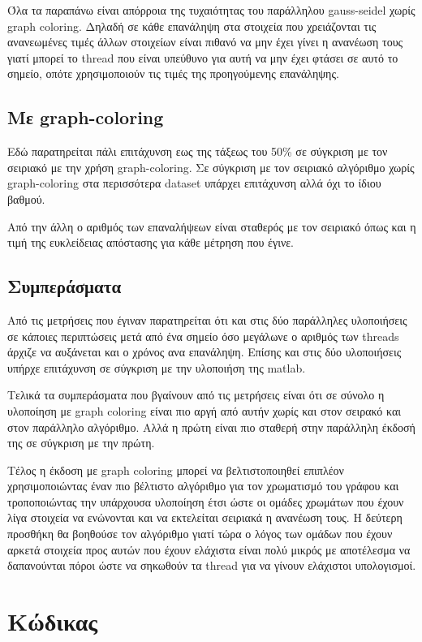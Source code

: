 \documentclass[10p]{report}
\begin{document}
Όλα τα παραπάνω είναι απόρροια της τυχαιότητας του παράλληλου gauss-seidel χωρίς 
graph coloring. Δηλαδή σε κάθε επανάληψη στα στοιχεία που χρειάζονται τις ανανεωμένες 
τιμές άλλων στοιχείων είναι πιθανό να μην έχει γίνει η ανανέωση τους γιατί μπορεί 
το thread που είναι υπεύθυνο για αυτή να μην έχει φτάσει σε αυτό το σημείο, οπότε 
χρησιμοποιούν τις τιμές της προηγούμενης επανάληψης. 

\subsection*{Με graph-coloring}

Εδώ παρατηρείται πάλι επιτάχυνση εως της τάξεως του 50\% σε σύγκριση με τον σειριακό
με την χρήση graph-coloring. Σε σύγκριση με τον σειριακό αλγόριθμο χωρίς graph-coloring 
στα περισσότερα dataset υπάρχει επιτάχυνση αλλά όχι το ίδιου βαθμού. 

Από την άλλη ο αριθμός των επαναλήψεων είναι σταθερός με τον σειριακό όπως και 
η τιμή της ευκλείδειας απόστασης για κάθε μέτρηση που έγινε. 

\subsection*{Συμπεράσματα}
Από τις μετρήσεις που έγιναν παρατηρείται ότι και στις δύο παράλληλες υλοποιήσεις 
σε κάποιες περιπτώσεις μετά από ένα σημείο όσο μεγάλωνε ο αριθμός των threads 
άρχιζε να αυξάνεται και ο χρόνος ανα επανάληψη. Επίσης και στις δύο υλοποιήσεις 
υπήρχε επιτάχυνση σε σύγκριση με την υλοποιήση της matlab. 

Τελικά τα συμπεράσματα που βγαίνουν από τις μετρήσεις είναι ότι σε σύνολο η 
υλοποίηση με graph coloring είναι πιο αργή από αυτήν χωρίς και στον σειρακό και 
στον παράλληλο αλγόριθμο. Αλλά η πρώτη είναι πιο σταθερή στην παράλληλη έκδοσή της 
σε σύγκριση με την πρώτη. 

Τέλος η έκδοση με graph coloring μπορεί να βελτιστοποιηθεί επιπλέον χρησιμοποιώντας 
έναν πιο βέλτιστο αλγόριθμο για τον χρωματισμό του γράφου και τροποποιώντας την 
υπάρχουσα υλοποίηση έτσι ώστε οι ομάδες χρωμάτων που έχουν λίγα στοιχεία να ενώνονται 
και να εκτελείται σειριακά η ανανέωση τους. Η δεύτερη προσθήκη θα βοηθούσε τον 
αλγόριθμο γιατί τώρα ο λόγος των ομάδων που έχουν αρκετά στοιχεία προς αυτών που έχουν ελάχιστα
είναι πολύ μικρός με αποτέλεσμα να δαπανούνται πόροι ώστε να σηκωθούν τα thread για να
γίνουν ελάχιστοι υπολογισμοί. 

\section*{Κώδικας}
\end{document}
